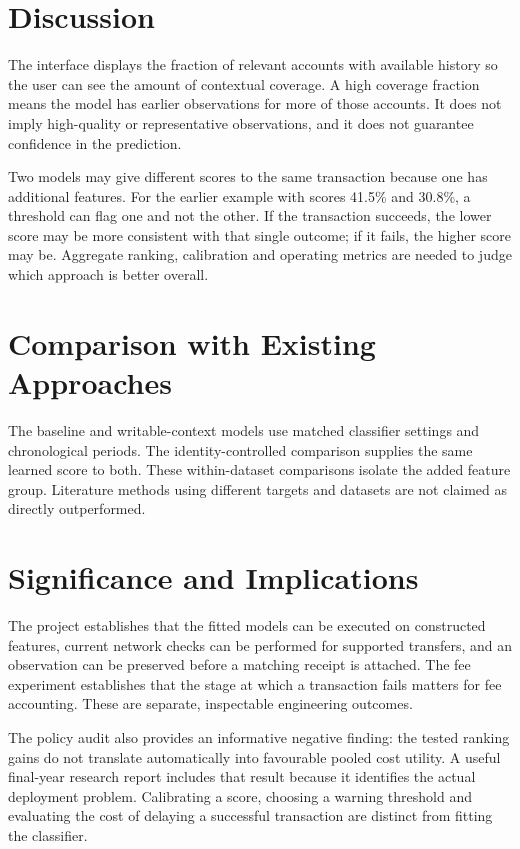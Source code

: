 \documentclass[12pt,a4paper,oneside]{report}
\begin{document}
\section{Discussion}
The interface displays the fraction of relevant accounts with available history so the user can see the amount of contextual coverage. A high coverage fraction means the model has earlier observations for more of those accounts. It does not imply high-quality or representative observations, and it does not guarantee confidence in the prediction.

Two models may give different scores to the same transaction because one has additional features. For the earlier example with scores 41.5\% and 30.8\%, a threshold can flag one and not the other. If the transaction succeeds, the lower score may be more consistent with that single outcome; if it fails, the higher score may be. Aggregate ranking, calibration and operating metrics are needed to judge which approach is better overall.

\section{Comparison with Existing Approaches}
The baseline and writable-context models use matched classifier settings and chronological periods. The identity-controlled comparison supplies the same learned score to both. These within-dataset comparisons isolate the added feature group. Literature methods using different targets and datasets are not claimed as directly outperformed.

\section{Significance and Implications}
The project establishes that the fitted models can be executed on constructed features, current network checks can be performed for supported transfers, and an observation can be preserved before a matching receipt is attached. The fee experiment establishes that the stage at which a transaction fails matters for fee accounting. These are separate, inspectable engineering outcomes.

The policy audit also provides an informative negative finding: the tested ranking gains do not translate automatically into favourable pooled cost utility. A useful final-year research report includes that result because it identifies the actual deployment problem. Calibrating a score, choosing a warning threshold and evaluating the cost of delaying a successful transaction are distinct from fitting the classifier.
\end{document}
